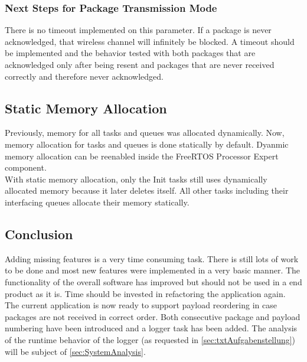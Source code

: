 \subsubsection{Next Steps for Package Transmission Mode}
There is no timeout implemented on this parameter. If a package is never acknowledged, that wireless channel will infinitely be blocked. A timeout should be implemented and the behavior tested with both packages that are acknowledged only after being resent and packages that are never received correctly and therefore never acknowledged.
%
%
\subsection{Static Memory Allocation}
Previously, memory for all tasks and queues was allocated dynamically. Now, memory allocation for tasks and queues is done statically by default. Dyanmic memory allocation can be reenabled inside the FreeRTOS Processor Expert component.\\
With static memory allocation, only the Init tasks still uses dynamically allocated memory because it later deletes itself. All other tasks including their interfacing queues allocate their memory statically.
%
%
\subsection{Conclusion}
Adding missing features is a very time consuming task. There is still lots of work to be done and most new features were implemented in a very basic manner. The functionality of the overall software has improved but should not be used in a end product as it is. Time should be invested in refactoring the application again.\\
The current application is now ready to support payload reordering in case packages are not received in correct order. Both consecutive package and payload numbering have been introduced and a logger task has been added. The analysis of the runtime behavior of the logger (as requested in \autoref{sec:txtAufgabenstellung}) will be subject of \autoref{sec:SystemAnalysis}.